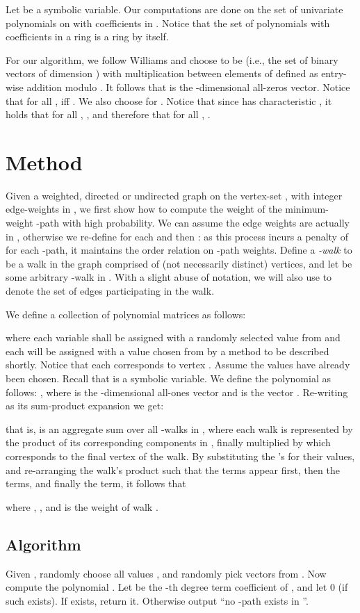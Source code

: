 \documentclass{llncs}
\begin{document}
Let  be a symbolic variable. Our computations are done on the set  of univariate polynomials on  with coefficients in . Notice that the set of polynomials with coefficients in a ring is a ring by itself.

For our algorithm, we follow Williams and choose  to be  (i.e., the set of binary vectors of dimension ) with multiplication between elements of  defined as entry-wise addition modulo . It follows that  is the -dimensional all-zeros vector. Notice that for all ,  iff . We also choose  for . Notice that since  has characteristic , it holds that for all , , and therefore that for all , .

\section{Method}\label{sec:method}
Given a weighted, directed or undirected graph  on the vertex-set , with integer edge-weights in , we first show how to compute the weight of the minimum-weight -path with high probability. We can assume the edge weights are actually in , otherwise we re-define  for each  and then : as this process incurs a penalty of  for each -path, it maintains the order relation on -path weights.
Define a \emph{-walk} to be a walk in the graph comprised of  (not necessarily distinct) vertices, and let  be some arbitrary -walk in . With a slight abuse of notation, we will also use  to denote the set of edges participating in the walk.

We define a collection  of polynomial matrices  as follows: 
 
where each variable  shall be assigned with a randomly selected value from  and each  will be assigned with a value chosen from  by a method to be described shortly. Notice that each  corresponds to vertex . Assume the values  have already been chosen. Recall that  is a symbolic variable. We define the polynomial  as follows: , where  is the -dimensional all-ones vector and  is the vector . 
Re-writing  as its sum-product expansion we get:

that is,  is an aggregate sum over all -walks in , where each walk  is represented by the product of its corresponding components in , finally multiplied by  which corresponds to the final vertex of the walk. By substituting the 's for their values, and re-arranging the walk's product such that the  terms appear first, then the  terms, and finally the  term, it follows that

where , , and  is the weight of walk .
\subsection{Algorithm}
Given , randomly choose all values , and randomly pick  vectors  from . Now compute the polynomial . Let  be the -th degree term coefficient of , and let 0 (if such exists). If  exists, return it. Otherwise output ``no -path exists in ''.
\end{document}
